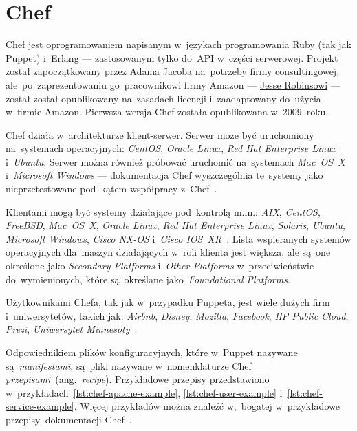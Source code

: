 \documentclass[thesis]{subfiles}
\begin{document}

\section{Chef}
\label{sec:chef}

Chef jest oprogramowaniem napisanym w~językach programowania \href{https://en.wikipedia.org/wiki/Ruby_(programming_language)}{Ruby} (tak jak Puppet) i~\href{https://en.wikipedia.org/wiki/Erlang_(programming_language)}{Erlang} --- zastosowanym tylko do~API w~części serwerowej. Projekt został zapoczątkowany przez \href{https://blog.chef.io/author/adam/}{Adama Jacoba} na~potrzeby firmy consultingowej, ale~po~zaprezentowaniu go~pracownikowi firmy Amazon --- \href{https://en.wikipedia.org/wiki/Jesse_Robbins}{Jesse Robinsowi} --- został został opublikowany na~zasadach licencji  i~zaadaptowany do~użycia w~firmie Amazon. Pierwsza wersja Chef została opublikowana w~2009~roku.

Chef działa w~architekturze klient-serwer. Serwer może być uruchomiony na~systemach operacyjnych: \emph{CentOS}, \emph{Oracle Linux}, \emph{Red Hat Enterprise Linux} i~\emph{Ubuntu}. Serwer można również próbować uruchomić na~systemach \emph{Mac~OS~X} i~\emph{Microsoft Windows} --- dokumentacja Chef wyszczególnia te~systemy jako nieprzetestowane pod~kątem współpracy z~Chef~\cite{chef-supported-platforms}.

Klientami mogą być systemy działające pod~kontrolą m.in.: \emph{AIX}, \emph{CentOS}, \emph{FreeBSD}, \emph{Mac~OS~X}, \emph{Oracle Linux}, \emph{Red Hat Enterprise Linux}, \emph{Solaris}, \emph{Ubuntu}, \emph{Microsoft Windows}, \emph{Cisco NX-OS} i~\emph{Cisco IOS~XR}~\cite{chef-supported-platforms}. Lista wspieranych systemów operacyjnych dla~maszyn działających w~roli klienta jest większa, ale są~one określone jako \emph{Secondary Platforms} i~\emph{Other Platforms} w~przeciwieństwie do~wymienionych, które są~określane jako~\emph{Foundational Platforms}.

Użytkownikami Chefa, tak jak w~przypadku Puppeta, jest wiele dużych firm i~uniwersytetów, takich jak: \emph{Airbnb}, \emph{Disney}, \emph{Mozilla}, \emph{Facebook}, \emph{HP Public Cloud}, \emph{Prezi}, \emph{Uniwersytet Minnesoty}~\cite{chef-customers,puppet-chef-disney}.

Odpowiednikiem plików konfiguracyjnych, które w~Puppet nazywane są~\emph{manifestami}, są~pliki nazywane w~nomenklaturze Chef \emph{przepisami}~(ang.~\emph{recipe}). Przykładowe przepisy przedstawiono w~przykładach~\ref{lst:chef-apache-example}, \ref{lst:chef-user-example} i~\ref{lst:chef-service-example}. Więcej przykładów można znaleźć w,~bogatej w~przykładowe przepisy, dokumentacji Chef~\cite{chef-examples}.
\end{document}
